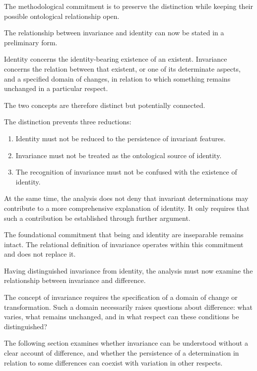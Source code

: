 The methodological commitment is to preserve
the distinction while keeping their possible
ontological relationship open.


The relationship between invariance and identity
can now be stated in a preliminary form.

Identity concerns the identity-bearing existence
of an existent. Invariance concerns the relation
between that existent, or one of its determinate
aspects, and a specified domain of changes,
in relation to which something remains unchanged
in a particular respect.

The two concepts are therefore distinct but
potentially connected.

The distinction prevents three reductions:

\begin{enumerate}
    \item Identity must not be reduced to the
    persistence of invariant features.

    \item Invariance must not be treated as the
    ontological source of identity.

    \item The recognition of invariance must not
    be confused with the existence of identity.
\end{enumerate}

At the same time, the analysis does not deny
that invariant determinations may contribute
to a more comprehensive explanation of identity.
It only requires that such a contribution be
established through further argument.

The foundational commitment that being and
identity are inseparable remains intact. The
relational definition of invariance operates
within this commitment and does not replace it.


Having distinguished invariance from identity,
the analysis must now examine the relationship
between invariance and difference.

The concept of invariance requires the specification
of a domain of change or transformation. Such
a domain necessarily raises questions about
difference: what varies, what remains unchanged,
and in what respect can these conditions be
distinguished?

The following section examines whether invariance
can be understood without a clear account of
difference, and whether the persistence of a
determination in relation to some differences
can coexist with variation in other respects.

